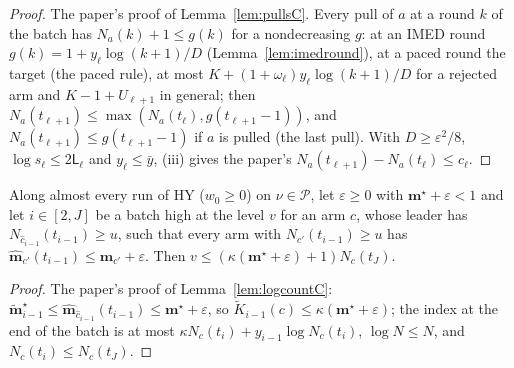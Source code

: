 \documentclass[11pt]{article}
\newcommand{\cP}{\mathcal P}
\begin{document}
\begin{proof}
The paper's proof of Lemma~\ref{lem:pullsC}. Every pull of $a$ at a round $k$ of the batch has
$N_a(k)+1\le g(k)$ for a nondecreasing $g$: at an IMED round $g(k)=1+y_\ell\log(k+1)/D$
(Lemma~\ref{lem:imedround}), at a paced round the target (the paced rule), at most
$K+(1+\omega_\ell)y_\ell\log(k+1)/D$ for a rejected arm and $K-1+U_{\ell+1}$ in general; then
$N_a(t_{\ell+1})\le\max(N_a(t_\ell),g(t_{\ell+1}-1))$, and $N_a(t_{\ell+1})\le g(t_{\ell+1}-1)$ if $a$ is
pulled (the last pull). With $D\ge\varepsilon^2/8$, $\log s_\ell\le2\mathsf L_\ell$ and $y_\ell\le\bar y$, (iii)
gives the paper's $N_a(t_{\ell+1})-N_a(t_\ell)\le c_\ell$.
\end{proof}

\begin{lemma}[logarithmic count when $x=1$, on a run]\label{flem:logcountC-run}
Along almost every run of HY ($w_0\ge0$) on $\nu\in\cP$, let $\varepsilon\ge0$ with $\mathbf m^\star+\varepsilon<1$ and let
$i\in[2,J]$ be a batch high at the level $v$ for an arm $c$, whose leader has
$N_{\hat c_{i-1}}(t_{i-1})\ge u$, such that every arm with $N_{c'}(t_{i-1})\ge u$ has
$\hat{\mathbf m}_{c'}(t_{i-1})\le\mathbf m_{c'}+\varepsilon$. Then $v\le(\kappa(\mathbf m^\star+\varepsilon)+1)N_c(t_J)$.
\end{lemma}

\begin{proof}
The paper's proof of Lemma~\ref{lem:logcountC}: $\tilde{\mathbf m}^\star_{i-1}\le\hat{\mathbf m}_{\hat c_{i-1}}(t_{i-1})\le
\mathbf m^\star+\varepsilon$, so $\tilde K_{i-1}(c)\le\kappa(\mathbf m^\star+\varepsilon)$; the index at the end of the batch is at
most $\kappa N_c(t_i)+y_{i-1}\log N_c(t_i)$, $\log N\le N$, and $N_c(t_i)\le N_c(t_J)$.
\end{proof}
\end{document}

